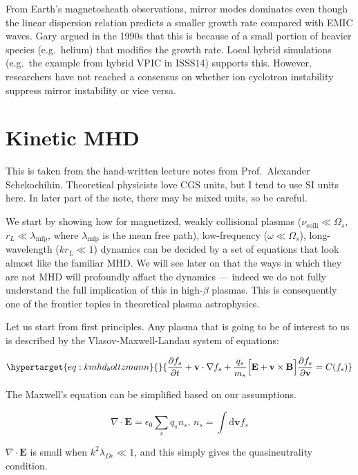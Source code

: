 \documentclass[
  notoc %
]{tufte-book}
\begin{document}
From Earth's magnetosheath observations, mirror modes dominates even
though the linear dispersion relation predicts a smaller growth rate
compared with EMIC waves. Gary argued in the 1990s that this is because
of a small portion of heavier species (e.g.~helium) that modifies the
growth rate. Local hybrid simulations (e.g.~the example from hybrid VPIC
in ISSS14) supports this. However, researchers have not reached a
consensus on whether ion cyclotron instability suppress mirror
instability or vice versa.

\hypertarget{sec:kmhd}{%
\chapter{Kinetic MHD}\label{sec:kmhd}}

This is taken from the hand-written lecture notes from Prof.~Alexander
Schekochihin. Theoretical physicists love CGS units, but I tend to use
SI units here. In later part of the note, there may be mixed units, so
be careful.

We start by showing how for magnetized, weakly collisional plasmas
(\(\nu_\text{colli} \ll \Omega_s\), \(r_L\ll \lambda_\text{mfp}\), where
\(\lambda_\text{mfp}\) is the mean free path), low-frequency
(\(\omega \ll \Omega_s\)), long-wavelength (\(kr_L\ll 1\)) dynamics can
be decided by a set of equations that look almost like the familiar MHD.
We will see later on that the ways in which they are not MHD will
profoundly affact the dynamics --- indeed we do not fully understand the
full implication of this in high-\(\beta\) plasmas. This is consequently
one of the frontier topics in theoretical plasma astrophysics.

Let us start from first principles. Any plasma that is going to be of
interest to us is described by the Vlasov-Maxwell-Landau system of
equations:

\begin{equation}\protect\hypertarget{eq:kmhd_boltzmann}{}{
\frac{\partial f_s}{\partial t} + \mathbf{v}\cdot\nabla f_s + \frac{q_s}{m_s}\Big[\mathbf{E} + \mathbf{v}\times\mathbf{B} \Big]\frac{\partial f_s}{\partial\mathbf{v}} = C(f_s)
}\label{eq:kmhd_boltzmann}\end{equation}

The Maxwell's equation can be simplified based on our assumptions.

\[
\nabla\cdot\mathbf{E} = \epsilon_0 \sum_s q_s n_s,\, n_s=\int \mathrm{d}\mathbf{v}f_s
\]

\(\nabla\cdot\mathbf{E}\) is small when \(k^2\lambda_{De}\ll 1\), and
this simply gives the quasineutrality condition.
\end{document}
